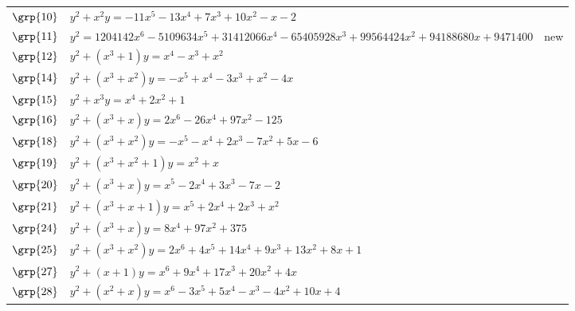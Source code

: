 \begin{longtable}{@{}>{\raggedright\arraybackslash}p{1.35cm}
 >{\raggedright\arraybackslash}p{}
 >{\raggedright\arraybackslash}p{1.25cm}@{}}
$\grp{10}$ & \href{https://www.lmfdb.org/Genus2Curve/Q/363/a/43923/1}{$y^2 + x^{2}y = -11x^{5}-13x^{4}+7x^{3}+10x^{2}-x-2$} & \cite{BSSVY}\\
$\grp{11}$ & $y^2 = 1204142x^{6}-5109634x^{5}+31412066x^{4}-65405928x^{3}+99564424x^{2}+94188680x+9471400$ & new\\
$\grp{12}$ & \href{https://www.lmfdb.org/Genus2Curve/Q/294/a/294/1}{$y^2 + (x^{3}+1)y = x^{4}-x^{3}+x^{2}$} & \cite{BSSVY}\\
$\grp{14}$ & \href{https://alpha.lmfdb.org/Genus2Curve/Q/?jump=[[0,-4,1,-3,1,-1],[0,0,1,1]]}{$y^2 + (x^{3}+x^{2})y = -x^{5}+x^{4}-3x^{3}+x^{2}-4x$} & \cite{BookerSutherland}\\
$\grp{15}$ & \href{https://www.lmfdb.org/Genus2Curve/Q/484/a/1936/1}{$y^2 + x^{3}y = x^{4}+2x^{2}+1$} & \cite{BSSVY}\\
$\grp{16}$ & \href{https://alpha.lmfdb.org/Genus2Curve/Q/?jump=[[-125,0,97,0,-26,0,2],[0,1,0,1]]}{$y^2 + (x^{3}+x)y = 2x^{6}-26x^{4}+97x^{2}-125$} & \cite{BookerSutherland}\\
$\grp{18}$ & \href{https://alpha.lmfdb.org/Genus2Curve/Q/?jump=[[-6,5,-7,2,-1,-1],[0,0,1,1]]}{$y^2 + (x^{3}+x^{2})y = -x^{5}-x^{4}+2x^{3}-7x^{2}+5x-6$} & \cite{BookerSutherland}\\
$\grp{19}$ & \href{https://www.lmfdb.org/Genus2Curve/Q/169/a/169/1}{$y^2 + (x^{3}+x^{2}+1)y = x^{2}+x$} & \cite{MazurTate1973,Ogg1973}\\
$\grp{20}$ & \href{https://alpha.lmfdb.org/Genus2Curve/Q/?jump=[[-2,-7,0,3,-2,1],[0,1,0,1]]}{$y^2 + (x^{3}+x)y = x^{5}-2x^{4}+3x^{3}-7x-2$} & \cite{HLP2000}\\
$\grp{21}$ & \href{https://www.lmfdb.org/Genus2Curve/Q/324/a/648/1}{$y^2 + (x^{3}+x+1)y = x^{5}+2x^{4}+2x^{3}+x^{2}$} & \cite{Ogg1973}\\
$\grp{24}$ & \href{https://alpha.lmfdb.org/Genus2Curve/Q/?jump=[[375,0,97,0,8],[0,1,0,1]]}{$y^2 + (x^{3}+x)y = 8x^{4}+97x^{2}+375$} & \cite{Leprevost1995}\\
$\grp{25}$ & \href{https://alpha.lmfdb.org/Genus2Curve/Q/?jump=[[1,8,13,9,14,4,2],[0,0,1,1]]}{$y^2 + (x^{3}+x^{2})y = 2x^{6}+4x^{5}+14x^{4}+9x^{3}+13x^{2}+8x+1$} & \cite{Leprevost1995,PZP2013}\\
$\grp{27}$ & \href{https://alpha.lmfdb.org/Genus2Curve/Q/?jump=[[0,4,20,17,9,0,1],[1,1]]}{$y^2 + (x+1)y = x^{6}+9x^{4}+17x^{3}+20x^{2}+4x$} & \cite{Leprevost1995}\\
$\grp{28}$ & \href{https://alpha.lmfdb.org/Genus2Curve/Q/?jump=[[4,10,-4,-1,5,-3,1],[0,1,1]]}{$y^2 + (x^{2}+x)y = x^{6}-3x^{5}+5x^{4}-x^{3}-4x^{2}+10x+4$} & \cite{PZP2013,Howe2015}\\

\end{longtable}
